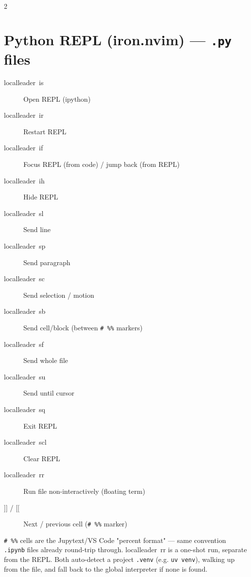\documentclass[14pt]{extarticle}
\newcommand{\key}[1]{\colorbox{keybg}{\ttfamily\small\mbox{#1}}}
\begin{document}
\begin{multicols}{2}
\section{Python REPL (iron.nvim) --- \texttt{.py} files}
\begin{description}
  \item[\key{localleader is}] Open REPL (ipython)
  \item[\key{localleader ir}] Restart REPL
  \item[\key{localleader if}] Focus REPL (from code) / jump back (from REPL)
  \item[\key{localleader ih}] Hide REPL
  \item[\key{localleader sl}] Send line
  \item[\key{localleader sp}] Send paragraph
  \item[\key{localleader sc}] Send selection / motion
  \item[\key{localleader sb}] Send cell/block (between \texttt{\# \%\%} markers)
  \item[\key{localleader sf}] Send whole file
  \item[\key{localleader su}] Send until cursor
  \item[\key{localleader sq}] Exit REPL
  \item[\key{localleader scl}] Clear REPL
  \item[\key{localleader rr}] Run file non-interactively (floating term)
  \item[\key{]]} / \key{[[}] Next / previous cell (\texttt{\# \%\%} marker)
\end{description}
{\small\color{note} \texttt{\# \%\%} cells are the Jupytext/VS Code "percent format" --- same convention \texttt{.ipynb} files already round-trip through. \key{localleader rr} is a one-shot run, separate from the REPL. Both auto-detect a project \texttt{.venv} (e.g. \texttt{uv venv}), walking up from the file, and fall back to the global interpreter if none is found.}


\end{multicols}
\end{document}
